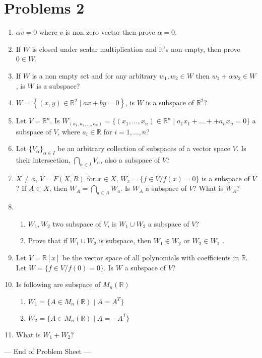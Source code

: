 \documentclass{article}
\begin{document}
\newpage

\section*{Problems 2}
\begin{enumerate} %
\item $\alpha v=0$ where $v$ is non zero vector then prove $\alpha=0$.
\item If $W$ is closed under scalar multiplication and it's non empty, then prove $0\in W$.
\item If $W$ is a non empty set and for any arbitrary $w_1,w_2 \in W$ then $w_1+\alpha w_2 \in W$, is $W$ is a subspace?

\item $W=\left\{ (x,y) \in \mathbb{R}^2 \mid ax+by=0  \right\}$, is $W$ is a subspace of $ \mathbb{R}^2$?
\item Let $V = \mathbb{R}^n$. Is $W_{(a_1, a_2,...,a_n) }= \{(x_1, \dots, x_n) \in \mathbb{R}^n \mid a_1x_1 + \dots + + a_nx_n = 0\}$ a subspace of $V$, where $a_i \in \mathbb{R}$ for $i=1, \dots, n$?
\item Let $\{V_\alpha\}_{\alpha \in I}$ be an arbitrary collection of subspaces of a vector space $V$. Is their intersection, $\bigcap_{\alpha \in I} V_\alpha$, also a subspace of $V$?
\item 
$X \neq\phi$, $V = F(X, R)$ for $x \in X$, $W_x = \{f \in V / f(x) = 0\}$ is a subspace of $V$? If $A \subset X$, then $W_A = \bigcap_{a \in A} W_a$. Is $W_A$ a subspace of $V$? What is $W_A$?
\item \begin{enumerate}
        \item $W_1,W_2 $ two subspace of $V$, is $W_1\cup W_2 $ a subspace of $V$?
        \item Prove that if $W_1\cup W_2 $ is subspace, then $W_1 \in W_2$ or  $W_2\in W_1$ . 
        \end{enumerate}
\item Let $V = \mathbb{R}[x]$ be the vector space of all polynomials with coefficients in $\mathbb{R}$. Let $W=\{f \in V / f(0) = 0\}$. Is $W$ a subspace of $V$?
\item Is following are subspace of $ M_n(\mathbb{R})$ 
\begin{enumerate}
         \item $W_1 = \{A \in M_n(\mathbb{R}) \mid A = A^T\}$
    \item $W_2 = \{A \in M_n(\mathbb{R}) \mid A = -A^T\}$
    \end{enumerate}
    \item What is $W_1+W_2$?
    \end{enumerate}
\vspace{2cm} %
\begin{center}
    --- End of Problem Sheet ---
\end{center}
\end{document}
